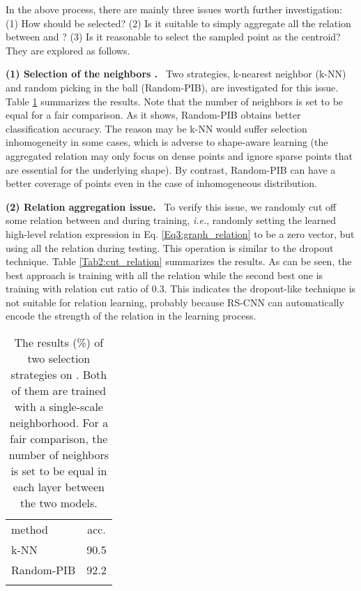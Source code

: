 \documentclass[10pt,twocolumn,letterpaper]{article}
\begin{document}
In the above process, there are mainly three issues worth further investigation: (1) How should  be selected? (2) Is it suitable to simply aggregate all the relation between  and ? (3) Is it reasonable to select the sampled point  as the centroid? They are explored as follows.

\vspace{10pt}
\noindent \textbf{(1) Selection of the neighbors .} \ Two strategies, k-nearest neighbor (k-NN) and random picking in the ball (Random-PIB), are investigated for this issue. Table \ref{Tab1:knn} summarizes the results. Note that the number of neighbors is set to be equal for a fair comparison. As it shows, Random-PIB obtains better classification accuracy. The reason may be k-NN would suffer selection inhomogeneity in some cases, which is adverse to shape-aware learning (the aggregated relation may only focus on dense points and ignore sparse points that are essential for the underlying shape). By contrast, Random-PIB can have a better coverage of points even in the case of inhomogeneous distribution.

\vspace{10pt}
\noindent \textbf{(2) Relation aggregation issue.} \ To verify this issue, we randomly cut off some relation between  and  during training, \textit{i.e.}, randomly setting the learned high-level relation expression  in Eq. \eqref{Eq3:graph_relation} to be a zero vector, but using all the relation during testing. This operation is similar to the dropout technique. Table \ref{Tab2:cut_relation} summarizes the results. As can be seen, the best approach is training with all the relation while the second best one is training with relation cut ratio of 0.3. This indicates the dropout-like technique is not suitable for relation learning, probably because RS-CNN can automatically encode the strength of the relation in the learning process.

\begin{table}[t]
  \centering
\caption{The results (\%) of two selection strategies on . Both of them are trained with a single-scale neighborhood. For a fair comparison, the number of neighbors is set to be equal in each layer between the two models.}
\begin{tabular}{l|c}
  \Xhline{0.8pt}
  method & acc. \\
\Xhline{0.5pt}
  k-NN  & 90.5 \\
  Random-PIB & 92.2 \\
  \Xhline{0.8pt}
  \end{tabular}
  \label{Tab1:knn}
  \vspace{6pt}
\end{table}
\end{document}
